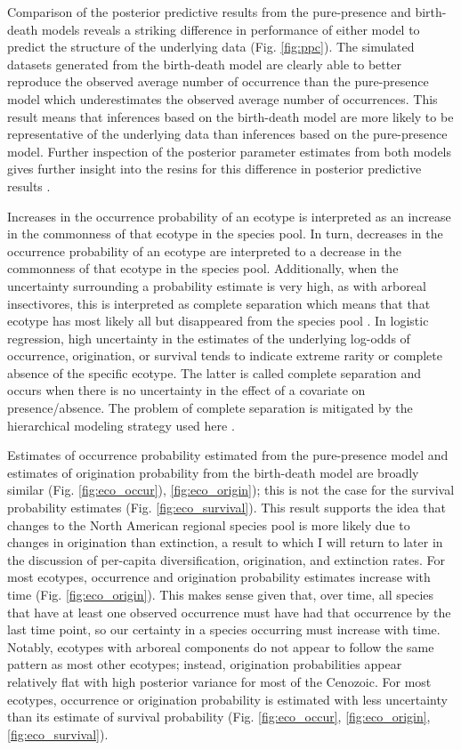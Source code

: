 Comparison of the posterior predictive results from the pure-presence and birth-death models reveals a striking difference in performance of either model to predict the structure of the underlying data (Fig. \ref{fig:ppc}). The simulated datasets generated from the birth-death model are clearly able to better reproduce the observed average number of occurrence than the pure-presence model which underestimates the observed average number of occurrences. This result means that inferences based on the birth-death model are more likely to be representative of the underlying data than inferences based on the pure-presence model. Further inspection of the posterior parameter estimates from both models gives further insight into the resins for this difference in posterior predictive results \citep{Gelman2013d}. 

Increases in the occurrence probability of an ecotype is interpreted as an increase in the commonness of that ecotype in the species pool. In turn, decreases in the occurrence probability of an ecotype are interpreted to a decrease in the commonness of that ecotype in the species pool. Additionally, when the uncertainty surrounding a probability estimate is very high, as with arboreal insectivores, this is interpreted as complete separation which means that that ecotype has most likely all but disappeared from the species pool \citep{Gelman2007}. In logistic regression, high uncertainty in the estimates of the underlying log-odds of occurrence, origination, or survival tends to indicate extreme rarity or complete absence of the specific ecotype. The latter is called complete separation and occurs when there is no uncertainty in the effect of a covariate on presence/absence. The problem of complete separation is mitigated by the hierarchical modeling strategy used here \citep{Gelman2013d,Gelman2007,McElreath2016}.

Estimates of occurrence probability estimated from the pure-presence model and estimates of origination probability from the birth-death model are broadly similar (Fig. \ref{fig:eco_occur}), \ref{fig:eco_origin}); this is not the case for the survival probability estimates (Fig. \ref{fig:eco_survival}). This result supports the idea that changes to the North American regional species pool is more likely due to changes in origination than extinction, a result to which I will return to later in the discussion of per-capita diversification, origination, and extinction rates. For most ecotypes, occurrence and origination probability estimates increase with time (Fig. \ref{fig:eco_origin}). This makes sense given that, over time, all species that have at least one observed occurrence must have had that occurrence by the last time point, so our certainty in a species occurring must increase with time. Notably, ecotypes with arboreal components do not appear to follow the same pattern as most other ecotypes; instead, origination probabilities appear relatively flat with high posterior variance for most of the Cenozoic. For most ecotypes, occurrence or origination probability is estimated with less uncertainty than its estimate of survival probability (Fig. \ref{fig:eco_occur}, \ref{fig:eco_origin}, \ref{fig:eco_survival}). 



